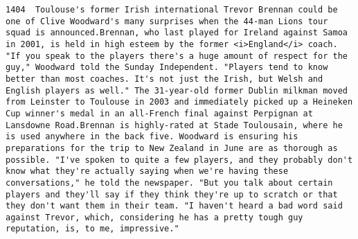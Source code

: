 \documentclass[11pt]{article}
\begin{document}
\begin{Verbatim}[commandchars=\\\{\}]
         1404  Toulouse's former Irish international Trevor Brennan could be one of Clive Woodward's many surprises when the 44-man Lions tour squad is announced.Brennan, who last played for Ireland against Samoa in 2001, is held in high esteem by the former <i>England</i> coach. "If you speak to the players there's a huge amount of respect for the guy," Woodward told the Sunday Independent. "Players tend to know better than most coaches. It's not just the Irish, but Welsh and English players as well." The 31-year-old former Dublin milkman moved from Leinster to Toulouse in 2003 and immediately picked up a Heineken Cup winner's medal in an all-French final against Perpignan at Lansdowne Road.Brennan is highly-rated at Stade Toulousain, where he is used anywhere in the back five. Woodward is ensuring his preparations for the trip to New Zealand in June are as thorough as possible. "I've spoken to quite a few players, and they probably don't know what they're actually saying when we're having these conversations," he told the newspaper. "But you talk about certain players and they'll say if they think they're up to scratch or that they don't want them in their team. "I haven't heard a bad word said against Trevor, which, considering he has a pretty tough guy reputation, is, to me, impressive."                                                                                                                                                                                                                                                                                                                                                                                                                                                                                                                                                                                                                                                                                                                                                                                                                                                                                                                                                                                                                                                                                                                                                                                                                                                                                                                                                                                                                                                                                                                                                                                                                                                                                                                                                                                                                                                                                                                                                                                                                                                                  
\end{Verbatim}
\end{document}
